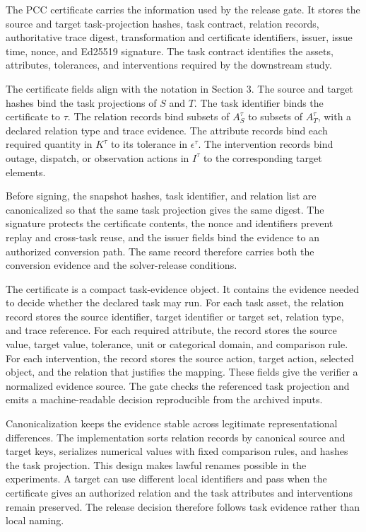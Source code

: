 \documentclass[preprint,12pt]{elsarticle}
\begin{document}
The PCC certificate carries the information used by the release gate. It stores the source and target task-projection hashes, task contract, relation records, authoritative trace digest, transformation and certificate identifiers, issuer, issue time, nonce, and Ed25519 signature. The task contract identifies the assets, attributes, tolerances, and interventions required by the downstream study.

The certificate fields align with the notation in Section 3. The source and target hashes bind the task projections of $S$ and $T$. The task identifier binds the certificate to $\tau$. The relation records bind subsets of $A_S^\tau$ to subsets of $A_T^\tau$, with a declared relation type and trace evidence. The attribute records bind each required quantity in $K^\tau$ to its tolerance in $\epsilon^\tau$. The intervention records bind outage, dispatch, or observation actions in $I^\tau$ to the corresponding target elements.

Before signing, the snapshot hashes, task identifier, and relation list are canonicalized so that the same task projection gives the same digest. The signature protects the certificate contents, the nonce and identifiers prevent replay and cross-task reuse, and the issuer fields bind the evidence to an authorized conversion path. The same record therefore carries both the conversion evidence and the solver-release conditions.

The certificate is a compact task-evidence object. It contains the evidence needed to decide whether the declared task may run. For each task asset, the relation record stores the source identifier, target identifier or target set, relation type, and trace reference. For each required attribute, the record stores the source value, target value, tolerance, unit or categorical domain, and comparison rule. For each intervention, the record stores the source action, target action, selected object, and the relation that justifies the mapping. These fields give the verifier a normalized evidence source. The gate checks the referenced task projection and emits a machine-readable decision reproducible from the archived inputs.

Canonicalization keeps the evidence stable across legitimate representational differences. The implementation sorts relation records by canonical source and target keys, serializes numerical values with fixed comparison rules, and hashes the task projection. This design makes lawful renames possible in the experiments. A target can use different local identifiers and pass when the certificate gives an authorized relation and the task attributes and interventions remain preserved. The release decision therefore follows task evidence rather than local naming.
\end{document}
